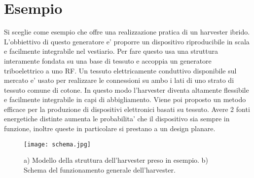 \chapter{Esempio}
    Si sceglie come esempio \cite{kouWearableAllFabricHybrid2024} che offre una realizzazione pratica di un harvester ibrido. L'obbiettivo di questo generatore e' proporre un dispositivo riproducibile in scala e facilmente integrabile nel vestiario. Per fare questo usa una struttura interamente fondata su una base di tessuto e accoppia un generatore triboelettrico a uno RF. Un tessuto elettricamente conduttivo disponibile sul mercato e' usato per realizzare le connessioni su ambo i lati di uno strato di tessuto comune di cotone. In questo modo l'harvester diventa altamente flessibile e facilmente integrabile in capi di abbigliamento. Viene poi proposto un metodo efficace per la produzione di dispositivi elettronici basati su tessuto. Avere 2 fonti energetiche distinte aumenta le probabilita' che il dispositivo sia sempre in funzione, inoltre queste in particolare si prestano a un design planare.
    
    \begin{figure}[H]
        \texttt{[image: schema.jpg]}
        \centering
        \caption{a) Modello della struttura dell'harvester preso in esempio. b) Schema del funzionamento generale dell'harvester.\cite{kouWearableAllFabricHybrid2024}}
        \label{fig:schema}
    \end{figure}

